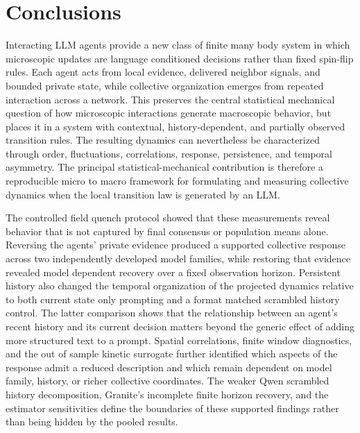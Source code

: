 \documentclass[12pt]{article}
\begin{document}
\section{Conclusions}
\label{sec:conclusions}

Interacting LLM agents provide a new class of finite many body system in which
microscopic updates are language conditioned decisions rather than fixed
spin-flip rules. Each agent acts from local evidence, delivered neighbor
signals, and bounded private state, while collective organization emerges from
repeated interaction across a network. This preserves the central
statistical mechanical question of how microscopic interactions generate
macroscopic behavior, but places it in a system with contextual,
history-dependent, and partially observed transition rules. The resulting
dynamics can nevertheless be characterized through order, fluctuations,
correlations, response, persistence, and temporal asymmetry. The principal
statistical-mechanical contribution is therefore a reproducible
micro to macro framework for formulating and measuring collective dynamics
when the local transition law is generated by an LLM.

The controlled field quench protocol showed that these measurements reveal
behavior that is not captured by final consensus or population means alone.
Reversing the agents' private evidence produced a supported collective
response across two independently developed model families, while restoring
that evidence revealed model dependent recovery over a fixed observation
horizon. Persistent history also changed the temporal organization of the
projected dynamics relative to both current state only prompting and a
format matched scrambled history control. The latter comparison shows that the
relationship between an agent's recent history and its current decision
matters beyond the generic effect of adding more structured text to a prompt.
Spatial correlations, finite window diagnostics, and the out of sample kinetic
surrogate further identified which aspects of the response admit a reduced
description and which remain dependent on model family, history, or richer
collective coordinates. The weaker Qwen scrambled history decomposition,
Granite's incomplete finite horizon recovery, and the estimator sensitivities
define the boundaries of these supported findings rather than being hidden by
the pooled results.
\end{document}
